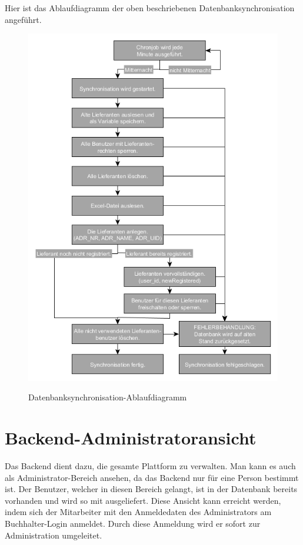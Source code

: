 \newpage
Hier ist das Ablaufdiagramm der oben beschriebenen Datenbanksynchronisation angeführt.
\begin{figure}[!h]
    \centering
    \includegraphics[width=15cm]{figures/DatenbankSynchronisieren.png}
    \label{fig:datenbanksynchronisation}
    \caption{Datenbanksynchronisation-Ablaufdiagramm}
\end{figure}
\newpage

\section{Backend-Administratoransicht}
Das Backend dient dazu, die gesamte Plattform zu verwalten. Man kann es auch als Administrator-Bereich ansehen, da das Backend nur für eine Person bestimmt ist. Der Benutzer, welcher in diesen Bereich gelangt, ist in der Datenbank bereits vorhanden und wird so mit ausgeliefert. Diese Ansicht kann erreicht werden, indem sich der Mitarbeiter mit den Anmeldedaten des Administrators am Buchhalter-Login anmeldet. Durch diese Anmeldung wird er sofort zur Administration umgeleitet.

